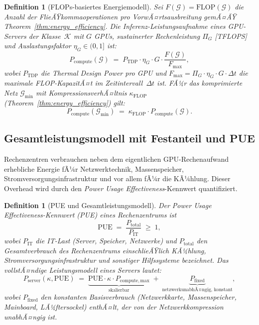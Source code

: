 ﻿\documentclass[12pt, a4paper, openany]{report}
\newtheorem{definition}[theorem]{Definition}
\newcommand{\calG}{\mathcal{G}}
\begin{document}
\begin{definition}[FLOPs-basiertes Energiemodell]
\label{def:flop_energy}
Sei $F(\calG) = \mathrm{FLOP}(\calG)$ die Anzahl der FlieÃŸkommaoperationen
pro VorwÃ¤rtsausbreitung gemÃ¤ÃŸ Theorem~\ref{thm:energy_efficiency}.  Die
\emph{Inferenz-Leistungsaufnahme} eines GPU-Servers der Klasse~$\mathcal{K}$
mit $G$ GPUs, sustainerter Rechenleistung $\Pi_G$ [TFLOPS] und
Auslastungsfaktor $\eta_G \in (0,1]$ ist:
\begin{equation}
  \label{eq:compute_power}
  P_{\mathrm{compute}}(\calG)
  \;=\;
  P_{\mathrm{TDP}} \cdot \eta_G \cdot G \cdot
  \frac{F(\calG)}{F_{\mathrm{max}}},
\end{equation}
wobei $P_{\mathrm{TDP}}$ die Thermal Design Power pro GPU und
$F_{\mathrm{max}} = \Pi_G \cdot \eta_G \cdot G \cdot \Delta t$ die maximale
FLOP-KapazitÃ¤t im Zeitintervall~$\Delta t$ ist.  FÃ¼r das komprimierte
Netz $\calG_{\min}$ mit KompressionsverhÃ¤ltnis $\kappa_{\mathrm{FLOP}}$
(Theorem~\ref{thm:energy_efficiency}) gilt:
\begin{equation}
  \label{eq:compute_power_compressed}
  P_{\mathrm{compute}}(\calG_{\min})
  \;=\;
  \kappa_{\mathrm{FLOP}} \cdot P_{\mathrm{compute}}(\calG).
\end{equation}
\end{definition}

\subsection{Gesamtleistungsmodell mit Festanteil und PUE}

Rechenzentren verbrauchen neben dem eigentlichen GPU-Rechenaufwand erhebliche
Energie fÃ¼r Netzwerktechnik, Massenspeicher, Stromversorgungsinfrastruktur
und vor allem fÃ¼r die KÃ¼hlung.  Dieser Overhead wird durch den
\emph{Power Usage Effectiveness}-Kennwert quantifiziert.

\begin{definition}[PUE und Gesamtleistungsmodell]
\label{def:pue}
Der \emph{Power Usage Effectiveness}-Kennwert (PUE) eines Rechenzentrums ist
\begin{equation}
  \label{eq:pue_def}
  \mathrm{PUE}
  \;=\;
  \frac{P_{\mathrm{total}}}{P_{\mathrm{IT}}}
  \;\geq\; 1,
\end{equation}
wobei $P_{\mathrm{IT}}$ die IT-Last (Server, Speicher, Netzwerke) und
$P_{\mathrm{total}}$ den Gesamtverbrauch des Rechenzentrums
einschlieÃŸlich KÃ¼hlung, Stromversorgungsinfrastruktur und sonstiger
Hilfssysteme bezeichnet.  Das \emph{vollstÃ¤ndige Leistungsmodell} eines
Servers lautet:
\begin{equation}
  \label{eq:total_power}
  P_{\mathrm{server}}(\kappa, \mathrm{PUE})
  \;=\;
  \underbrace{\mathrm{PUE} \cdot \kappa \cdot P_{\mathrm{compute,max}}}_{\text{skalierbar}}
  \;+\;
  \underbrace{P_{\mathrm{fixed}}}_{\text{netzwerkunabhÃ¤ngig, konstant}},
\end{equation}
wobei $P_{\mathrm{fixed}}$ den konstanten Basisverbrauch (Netzwerkkarte,
Massenspeicher, Mainboard, LÃ¼ftersockel) enthÃ¤lt, der von der Netzwerkkompression
\emph{unabhÃ¤ngig} ist.
\end{definition}
\end{document}
